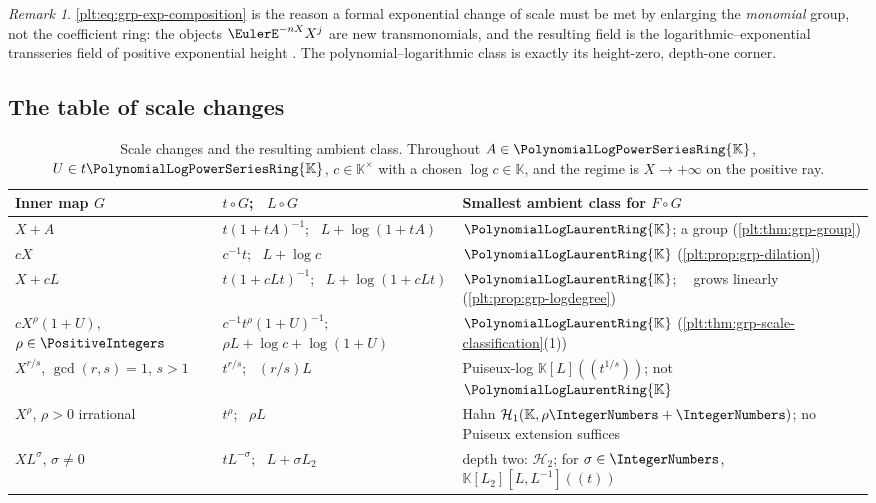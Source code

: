 \documentclass[11pt,oneside]{article}
\theoremstyle{plain}
\theoremstyle{definition}
\theoremstyle{remark}
\newtheorem{remark}[theorem]{Remark}
\newcommand{\K}{\mathbb{K}}
\newcommand{\PLpow}{\PolynomialLogPowerSeriesRing{\K}}   %
\newcommand{\PLlau}{\PolynomialLogLaurentRing{\K}}       %
\DeclareMathOperator{\degL}{deg_{L}}
\newcommand{\compose}{\mathbin{\circ}}
\begin{document}
\begin{remark}
\eqref{plt:eq:grp-exp-composition} is the reason a formal exponential change of
scale must be met by enlarging the \emph{monomial} group, not the coefficient
ring: the objects \(\EulerE^{-nX}X^{j}\) are new transmonomials, and the
resulting field is the logarithmic--exponential transseries field of positive
exponential height \cite{adh-book,edgar-beginners,vanderhoeven-book}.  The
polynomial--logarithmic class is exactly its height-zero, depth-one corner.
\end{remark}

\subsection{The table of scale changes}

\begin{table}[htbp]
\centering\small
\caption{Scale changes and the resulting ambient class.  Throughout
\(A\in\PLpow\), \(U\in t\PLpow\), \(c\in\K^{\times}\) with a chosen
\(\log c\in\K\), and the regime is \(X\to+\infty\) on the positive ray.}
\label{plt:tab:grp-scale-changes}
\begin{tabular}{|p{}|p{}|p{}|}
\hline
Inner map \(G\) & \(t\compose G\); \ \(L\compose G\) &
Smallest ambient class for \(F\compose G\)\\
\hline
\(X+A\) &
\(t(1+tA)^{-1}\); \ \(L+\log(1+tA)\) &
\(\PLlau\); a group (\cref{plt:thm:grp-group})\\
\hline
\(cX\) &
\(c^{-1}t\); \ \(L+\log c\) &
\(\PLlau\) (\cref{plt:prop:grp-dilation})\\
\hline
\(X+cL\) &
\(t(1+cLt)^{-1}\); \ \(L+\log(1+cLt)\) &
\(\PLlau\); \(\degL\) grows linearly
(\cref{plt:prop:grp-logdegree})\\
\hline
\(cX^{\rho}(1+U)\), \(\rho\in\PositiveIntegers\) &
\(c^{-1}t^{\rho}(1+U)^{-1}\); \ \(\rho L+\log c+\log(1+U)\) &
\(\PLlau\) (\cref{plt:thm:grp-scale-classification}(1))\\
\hline
\(X^{r/s}\), \(\gcd(r,s)=1\), \(s>1\) &
\(t^{r/s}\); \ \((r/s)L\) &
Puiseux-log \(\K[L]((t^{1/s}))\); not \(\PLlau\)\\
\hline
\(X^{\rho}\), \(\rho>0\) irrational &
\(t^{\rho}\); \ \(\rho L\) &
Hahn \(\mathcal H_1(\K,\rho\IntegerNumbers+\IntegerNumbers)\); no Puiseux
extension suffices\\
\hline
\(XL^{\sigma}\), \(\sigma\ne0\) &
\(tL^{-\sigma}\); \ \(L+\sigma L_2\) &
depth two: \(\mathcal H_2\); for
\(\sigma\in\IntegerNumbers\), \(\K[L_2][L,L^{-1}]((t))\)\\

\end{tabular}
\end{table}
\end{document}
